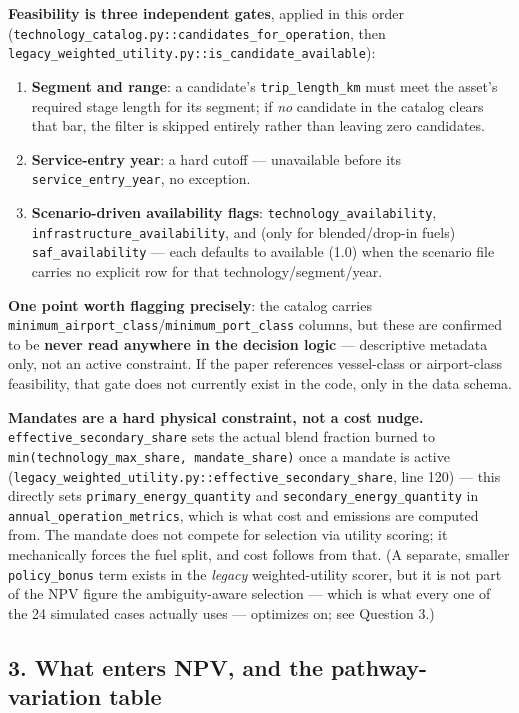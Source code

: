 \documentclass{article}
\begin{document}
\textbf{Feasibility is three independent gates}, applied in this order
(\texttt{technology\_catalog.py::candidates\_for\_operation}, then
\texttt{legacy\_weighted\_utility.py::is\_candidate\_available}):
\begin{enumerate}
  \item \textbf{Segment and range}: a candidate's \verb|trip_length_km| must
    meet the asset's required stage length for its segment; if \emph{no}
    candidate in the catalog clears that bar, the filter is skipped entirely
    rather than leaving zero candidates.
  \item \textbf{Service-entry year}: a hard cutoff --- unavailable before its
    \verb|service_entry_year|, no exception.
  \item \textbf{Scenario-driven availability flags}: \verb|technology_availability|,
    \verb|infrastructure_availability|, and (only for blended/drop-in fuels)
    \verb|saf_availability| --- each defaults to available (1.0) when the
    scenario file carries no explicit row for that technology/segment/year.
\end{enumerate}

\textbf{One point worth flagging precisely}: the catalog carries
\verb|minimum_airport_class|/\verb|minimum_port_class| columns, but these are
confirmed to be \textbf{never read anywhere in the decision logic} ---
descriptive metadata only, not an active constraint. If the paper references
vessel-class or airport-class feasibility, that gate does not currently
exist in the code, only in the data schema.

\textbf{Mandates are a hard physical constraint, not a cost nudge.}
\verb|effective_secondary_share| sets the actual blend fraction burned to
\verb|min(technology_max_share, mandate_share)| once a mandate is active
(\texttt{legacy\_weighted\_utility.py::effective\_secondary\_share}, line
120) --- this directly sets \verb|primary_energy_quantity| and
\verb|secondary_energy_quantity| in \verb|annual_operation_metrics|, which is
what cost and emissions are computed from. The mandate does not compete for
selection via utility scoring; it mechanically forces the fuel split, and
cost follows from that. (A separate, smaller \verb|policy_bonus| term exists
in the \emph{legacy} weighted-utility scorer, but it is not part of the NPV
figure the ambiguity-aware selection --- which is what every one of the 24
simulated cases actually uses --- optimizes on; see Question 3.)

\subsection*{3. What enters NPV, and the pathway-variation table}
\end{document}
